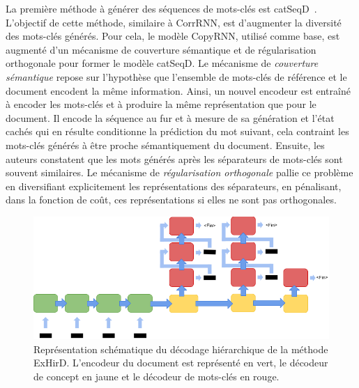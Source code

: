 La première méthode à générer des séquences de mots-clés est catSeqD~\cite{yuan_one_2020,yuan_generating_2018}.
L'objectif de cette méthode, similaire à CorrRNN, est d'augmenter la diversité des mots-clés générés.
%
Pour cela, le modèle CopyRNN, utilisé comme base, est augmenté d'un mécanisme de couverture sémantique et de régularisation orthogonale pour former le modèle catSeqD.
%
Le mécanisme de \emph{couverture sémantique} repose sur l'hypothèse que l'ensemble de mots-clés de référence et le document encodent la même information.
Ainsi, un nouvel encodeur est entraîné à encoder les mots-clés et à produire la même représentation que pour le document.
Il encode la séquence au fur et à mesure de sa génération et l'état cachés qui en résulte conditionne la prédiction du mot suivant, cela contraint les mots-clés générés à être proche sémantiquement du document.
%
Ensuite, les auteurs constatent que les mots générés après les séparateurs de mots-clés sont souvent similaires.
Le mécanisme de \emph{régularisation orthogonale} pallie ce problème en diversifiant explicitement les représentations des séparateurs, en pénalisant, dans la fonction de coût, ces représentations si elles ne sont pas orthogonales.

\begin{figure}
    \centering
    \includegraphics[scale=0.5]{2_production_mots_cles/exhird.png}
    \caption{Représentation schématique du décodage hiérarchique de la méthode ExHirD. L'encodeur du document est représenté en vert, le décodeur de concept en jaune et le décodeur de mots-clés en rouge.}
    \label{fig:schema_exhird}
\end{figure}

